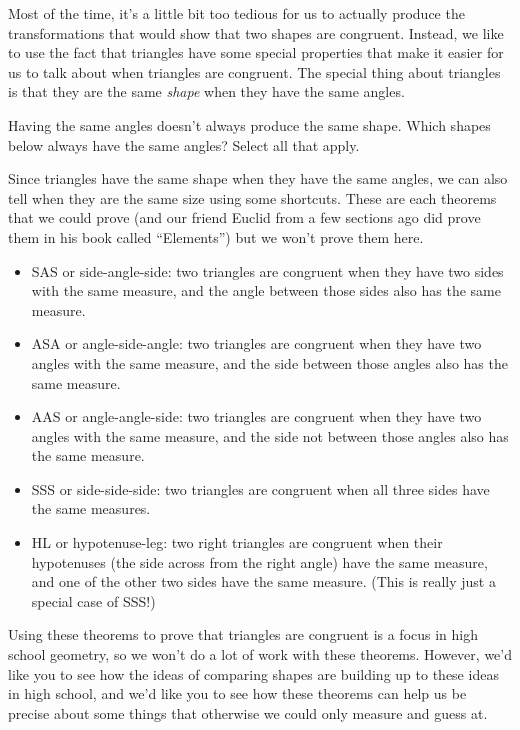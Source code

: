 \documentclass{ximera}
\begin{document}
Most of the time, it's a little bit too tedious for us to actually produce the transformations that would show that two shapes are congruent. Instead, we like to use the fact that triangles have some special properties that make it easier for us to talk about when triangles are congruent. The special thing about triangles is that they are the same \emph{shape} when they have the same angles.
\begin{question}
Having the same angles doesn't always produce the same shape. Which shapes below always have the same angles? Select all that apply.
\begin{selectAll}
\end{selectAll}
\end{question}
Since triangles have the same shape when they have the same angles, we can also tell when they are the same size using some shortcuts. These are each theorems that we could prove (and our friend Euclid from a few sections ago did prove them in his book called ``Elements'') but we won't prove them here. 
\begin{itemize}
	\item SAS or side-angle-side: two triangles are congruent when they have two sides with the same measure, and the angle between those sides also has the same measure.
	\item ASA or angle-side-angle: two triangles are congruent when they have two angles with the same measure, and the side between those angles also has the same measure.
	\item AAS or angle-angle-side: two triangles are congruent when they have two angles with the same measure, and the side not between those angles also has the same measure.
	\item SSS or side-side-side: two triangles are congruent when all three sides have the same measures.
	\item HL or hypotenuse-leg: two right triangles are congruent when their hypotenuses (the side across from the right angle) have the same measure, and one of the other two sides have the same measure. (This is really just a special case of SSS!)
\end{itemize}
Using these theorems to prove that triangles are congruent is a focus in high school geometry, so we won't do a lot of work with these theorems. However, we'd like you to see how the ideas of comparing shapes are building up to these ideas in high school, and we'd like you to see how these theorems can help us be precise about some things that otherwise we could only measure and guess at.
\end{document}
